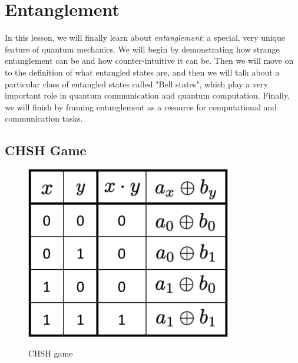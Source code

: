 \chapter{Entanglement}


In this lesson, we will finally learn about \emph{entanglement}: a special, very unique feature of quantum mechanics. We will begin by demonstrating how strange entanglement can be and how counter-intuitive it can be. Then we will move on to the definition of what entangled states are, and then we will talk about a particular class of entangled states called "Bell states", which play a very important role in quantum communication and quantum computation. Finally, we will finish by framing entanglement as a resource for computational and communication tasks.


\section{CHSH Game}
\label{sec:chsh-game}

\begin{figure}[H]
    \centering
    \includegraphics[width=0.8\textwidth]{lesson4/CHSH_table.pdf}
    \label{fig: 1}
    
        \caption{CHSH game}
    
\end{figure}
\fi



